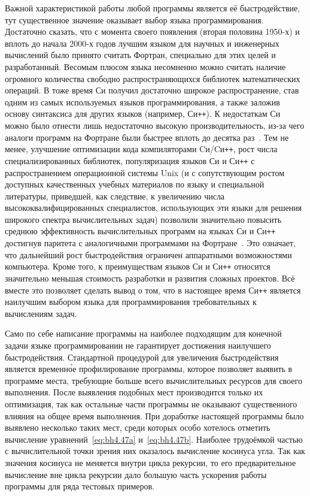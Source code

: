 Важной характеристикой работы любой программы является её
быстродействие, тут существенное значение оказывает выбор языка
программирования.  Достаточно сказать, что с момента своего появления
(вторая половина 1950-х) и вплоть до начала 2000-х годов лучшим языком
для научных и инженерных вычислений было принято считать Фортран,
специально для этих целей и разработанный. Весомым плюсом языка
несомненно можно считать наличие огромного количества свободно
распространяющихся библиотек математических операций. В тоже время Си
получил достаточно широкое распространение, став одним из самых
используемых языков программирования, а также заложив основу
синтаксиса для других языков (например, Си\texttt{++}).  К недостаткам
Си можно было отнести лишь недостаточно высокую производительность,
из-за чего аналоги программ на Фортране были быстрее вплоть до десятка
раз~\cite{Veldhuizen-1997}. Тем не менее, улучшение оптимизации кода
компиляторами Cи/Cи\texttt{++}, рост числа специализированных
библиотек, популяризация языков Си и Си\texttt{++} с распространением
операционной системы Unix (и с сопутствующим ростом доступных
качественных учебных материалов по языку и специальной литературы,
приведшей, как следствие, к увеличению числа высококвалифицированных
специалистов, использующих эти языки для решения широкого спектра
вычислительных задач) позволили значительно повысить среднюю
эффективность вычислительных программ на языках Си и Си\texttt{++}
достигнув паритета с аналогичными программами на
Фортране~\cite{Veldhuizen-1997,Markovich-FDTD-2013}.  Это означает,
что дальнейший рост быстродействия ограничен аппаратными возможностями
компьютера.  Кроме того, к преимуществам языков Си и Си\texttt{++}
относится значительно меньшая стоимость разработки и развития сложных
проектов.  Всё вместе это позволяет сделать вывод о том, что в
настоящее время Си\texttt{++} является наилучшим выбором языка для
программирования требовательных к вычислениям задач.

Само по себе написание программы на наиболее подходящим для конечной
задачи языке программировании не гарантирует достижения наилучшего
быстродействия.  Стандартной процедурой для увеличения быстродействия
является временн\'ое профилирование программы, которое позволяет
выявить в программе места, требующие больше всего вычислительных
ресурсов для своего выполнения.  После выявления подобных мест
производится только их оптимизация, так как остальные части программы
не оказывают существенного влияния на общее время выполнения.  При
доработке настоящей программы было выявлено несколько таких мест,
среди которых особо хотелось отметить вычисление
уравнений~\ref{eq:bh4.47a} и~\ref{eq:bh4.47b}.  Наиболее трудоёмкой
частью с вычислительной точки зрения них оказалось вычисление косинуса
угла. Так как значения косинуса не меняется внутри цикла рекурсии, то
его предварительное вычисление вне цикла рекурсии дало большую часть
ускорения работы программы для ряда тестовых примеров.

